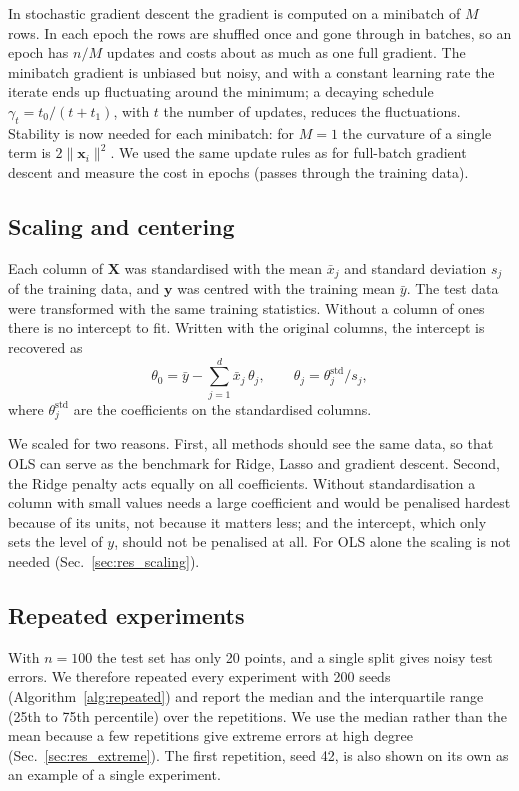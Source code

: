 In stochastic gradient descent \cite[Sec.~4.7]{HjorthJensen2026} the gradient is computed on a minibatch of $M$ rows. In each epoch the rows are shuffled once and gone through in batches, so an epoch has $n/M$ updates and costs about as much as one full gradient. The minibatch gradient is unbiased but noisy, and with a constant learning rate the iterate ends up fluctuating around the minimum; a decaying schedule $\gamma_t = t_0/(t + t_1)$, with $t$ the number of updates, reduces the fluctuations. Stability is now needed for each minibatch: for $M = 1$ the curvature of a single term is $2\lVert\mathbf{x}_i\rVert^2$. We used the same update rules as for full-batch gradient descent and measure the cost in epochs (passes through the training data).

\subsection{Scaling and centering}\label{sec:scaling}

Each column of $\mathbf{X}$ was standardised with the mean $\bar{x}_j$ and standard deviation $s_j$ of the training data, and $\mathbf{y}$ was centred with the training mean $\bar{y}$. The test data were transformed with the same training statistics. Without a column of ones there is no intercept to fit. Written with the original columns, the intercept is recovered as
$$
\theta_0 = \bar{y} - \sum_{j=1}^{d} \bar{x}_j\,\theta_j, \qquad \theta_j = \theta_j^{\mathrm{std}}/s_j ,
$$
where $\theta_j^{\mathrm{std}}$ are the coefficients on the standardised columns.

We scaled for two reasons. First, all methods should see the same data, so that OLS can serve as the benchmark for Ridge, Lasso and gradient descent. Second, the Ridge penalty acts equally on all coefficients. Without standardisation a column with small values needs a large coefficient and would be penalised hardest because of its units, not because it matters less; and the intercept, which only sets the level of $y$, should not be penalised at all. For OLS alone the scaling is not needed (Sec.~\ref{sec:res_scaling}).

\subsection{Repeated experiments}\label{sec:repeated}

With $n = 100$ the test set has only 20 points, and a single split gives noisy test errors. We therefore repeated every experiment with 200 seeds (Algorithm~\ref{alg:repeated}) and report the median and the interquartile range (25th to 75th percentile) over the repetitions. We use the median rather than the mean because a few repetitions give extreme errors at high degree (Sec.~\ref{sec:res_extreme}). The first repetition, seed 42, is also shown on its own as an example of a single experiment.


